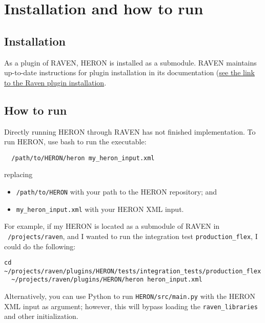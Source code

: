 \section{ Installation and how to run}

\subsection{Installation}
As a plugin of RAVEN, HERON is installed as a submodule. RAVEN maintains up-to-date instructions for
plugin installation in its documentation
(\href{https://github.com/idaholab/raven/wiki/Plugins}{see the link to the Raven plugin
installation}.

\subsection{How to run}
Directly running HERON through RAVEN has not finished implementation. To run HERON, use bash to
run the executable:
\begin{lstlisting}
  /path/to/HERON/heron my_heron_input.xml
\end{lstlisting}
replacing
\begin{itemize}
  \item \texttt{/path/to/HERON} with your path to the HERON repository; and
  \item \texttt{my\_heron\_input.xml} with your HERON XML input.
\end{itemize}
For example, if my HERON is located as a submodule of RAVEN in \texttt{~/projects/raven}, and I
wanted to run the integration test \texttt{production\_flex}, I could do the following:
\begin{lstlisting}[basicstyle=\footnotesize]
  cd ~/projects/raven/plugins/HERON/tests/integration_tests/production_flex
  ~/projects/raven/plugins/HERON/heron heron_input.xml
\end{lstlisting}
Alternatively, you can use Python to run \texttt{HERON/src/main.py} with the HERON XML input as
argument; however, this will bypass loading the \texttt{raven\_libraries} and other initialization.
